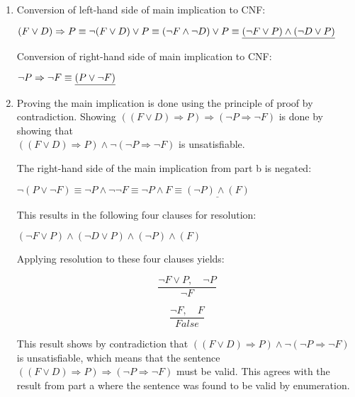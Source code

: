 \begin{enumerate}
\begin{enumerate}
\item
Conversion of left-hand side of main implication to \ac{CNF}:

$(F \lor D) \Rightarrow P\\
\equiv \neg (F \lor D) \lor P\\
\equiv (\neg F \land \neg D) \lor P\\
\equiv \underline{(\neg F \lor P) \land (\neg D \lor P)}$

Conversion of right-hand side of main implication to \ac{CNF}:

$\neg P \Rightarrow \neg F\\
\equiv \underline{(P \lor \neg F)}$

\item Proving the main implication is done using the principle of proof by contradiction. Showing $((F \lor D) \Rightarrow P) \Rightarrow (\neg P \Rightarrow \neg F)$ is done by showing that\\$((F \lor D) \Rightarrow P) \land \neg (\neg P \Rightarrow \neg F)$ is unsatisfiable.

The right-hand side of the main implication from part b is negated:

$\neg (P \lor \neg F) \equiv \neg P \land \neg \neg F \equiv \neg P \land F \equiv \underline{(\neg P) \land (F)}$

This results in the following four clauses for resolution:

$(\neg F \lor P) \land (\neg D \lor P) \land (\neg P) \land (F)$

Applying resolution to these four clauses yields:

\setcounter{equation}{0}

\begin{equation}
\frac{\neg F \lor P, \quad \neg P}{\neg F}
\end{equation}

\begin{equation}
\frac{\neg F, \quad F}{\textit{False}}
\end{equation}

This result shows by contradiction that $((F \lor D) \Rightarrow P) \land \neg (\neg P \Rightarrow \neg F)$ is unsatisfiable, which means that the sentence $((F \lor D) \Rightarrow P) \Rightarrow (\neg P \Rightarrow \neg F)$ must be valid. This agrees with the result from part a where the sentence was found to be valid by enumeration.
\end{enumerate}
\end{enumerate}

